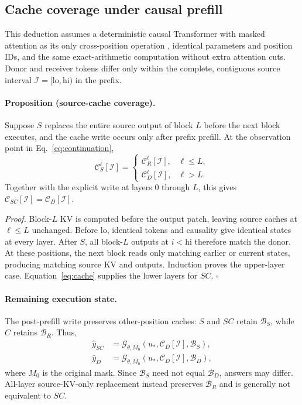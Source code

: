\subsection{Cache coverage under causal prefill}
\label{app:cache-coverage}

This deduction assumes a deterministic causal Transformer with masked
attention as its only cross-position operation
\citep{vaswani2017attention}, identical parameters and position IDs,
and the same exact-arithmetic computation without extra attention cuts.
Donor and receiver tokens differ only within the complete, contiguous
source interval $\mathcal I=[\mathrm{lo},\mathrm{hi})$ in the prefix.

\paragraph{Proposition (source-cache coverage).}
Suppose $S$ replaces the entire source output of block $L$ before the
next block executes, and the cache write occurs only after prefix prefill.
At the observation point in Eq.~\eqref{eq:continuation},
\begin{equation}
\mathcal C_S^\ell[\mathcal I]=
\begin{cases}
\mathcal C_R^\ell[\mathcal I],&\ell\le L,\\
\mathcal C_D^\ell[\mathcal I],&\ell>L.
\end{cases}
\label{eq:source-coverage}
\end{equation}
Together with the explicit write at layers $0$ through $L$, this gives
$\mathcal C_{SC}[\mathcal I]=\mathcal C_D[\mathcal I]$.

\emph{Proof.}
Block-$L$ KV is computed before the output patch, leaving source caches
at $\ell\le L$ unchanged. Before $\mathrm{lo}$, identical tokens and
causality give identical states at every layer. After $S$, all block-$L$
outputs at $i<\mathrm{hi}$ therefore match the donor.
At these positions, the next block reads only matching earlier or
current states, producing matching source KV and outputs.
Induction proves the upper-layer case.
Equation~\eqref{eq:cache} supplies the lower layers for $SC$.
\hfill$\square$


\paragraph{Remaining execution state.}
The post-prefill write preserves other-position caches: $S$ and $SC$
retain $\mathcal B_S$, while $C$ retains $\mathcal B_R$. Thus,
\begin{equation}
\begin{aligned}
\hat y_{SC}&=\mathcal G_{\theta,M_0}
 (u_*,\mathcal C_D[\mathcal I],\mathcal B_S),\\
\hat y_D&=\mathcal G_{\theta,M_0}
 (u_*,\mathcal C_D[\mathcal I],\mathcal B_D),
\end{aligned}
\label{eq:source-not-full}
\end{equation}
where $M_0$ is the original mask. Since $\mathcal B_S$ need not equal
$\mathcal B_D$, answers may differ. All-layer source-KV-only replacement
instead preserves $\mathcal B_R$ and is generally not equivalent to $SC$.

